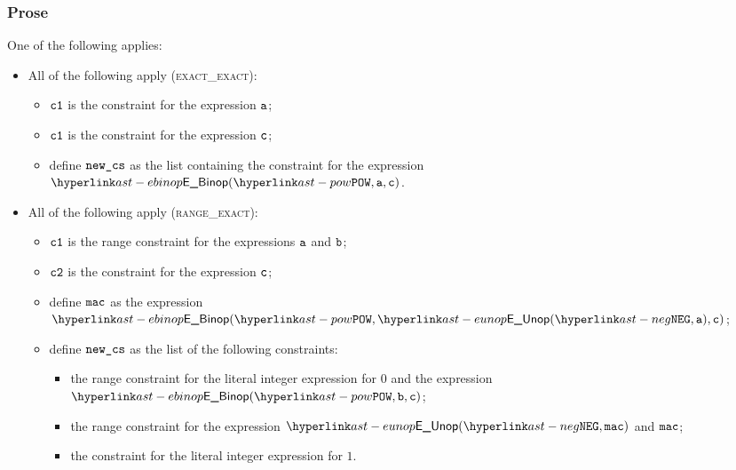 \subsubsection{Prose}
One of the following applies:
\begin{itemize}
  \item All of the following apply (\textsc{exact\_exact}):
  \begin{itemize}
    \item $\texttt{c1}$ is the constraint for the expression $\texttt{a}$;
    \item $\texttt{c1}$ is the constraint for the expression $\texttt{c}$;
    \item define $\texttt{new\_cs}$ as the list containing the constraint
    for the expression \\ $\EBinop(\POW, \va, \vc)$.
  \end{itemize}

  \item All of the following apply (\textsc{range\_exact}):
  \begin{itemize}
    \item $\texttt{c1}$ is the range constraint for the expressions $\texttt{a}$ and $\texttt{b}$;
    \item $\texttt{c2}$ is the constraint for the expression $\texttt{c}$;
    \item define $\texttt{mac}$ as the expression $\EBinop(\POW, \EUnop(\NEG, \va), \vc)$;
    \item define $\texttt{new\_cs}$ as the list of the following constraints:
    \begin{itemize}
      \item the range constraint for the literal integer expression for $0$ and the expression
            $\EBinop(\POW, \vb, \vc)$;
      \item the range constraint for the expression $\EUnop(\NEG, \vmac)$ and $\texttt{mac}$;
      \item the constraint for the literal integer expression for $1$.
    \end{itemize}
  \end{itemize}


\end{itemize}
